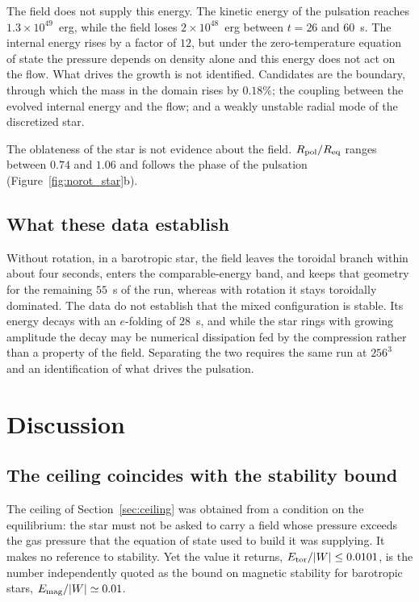 \documentclass[twocolumn,linenumbers]{aastex701}
\newcommand{\Etor}{E_{\rm tor}}
\begin{document}
The field does not supply this energy. The kinetic energy of the pulsation
reaches $1.3\times10^{49}$~erg, while the field loses $2\times10^{48}$~erg
between $t = 26$ and $60$~s. The internal energy rises by a factor of $12$,
but under the zero-temperature equation of state the pressure depends on
density alone and this energy does not act on the flow. What drives the growth
is not identified. Candidates are the boundary, through which the mass in the
domain rises by $0.18\%$; the coupling between the evolved internal energy and
the flow; and a weakly unstable radial mode of the discretized star.

The oblateness of the star is not evidence about the field. $R_{\rm
pol}/R_{\rm eq}$ ranges between $0.74$ and $1.06$ and follows the phase of the
pulsation (Figure~\ref{fig:norot_star}b).

\subsection{What these data establish}

Without rotation, in a barotropic star, the field leaves the toroidal branch
within about four seconds, enters the comparable-energy band, and keeps that
geometry for the remaining $55$~s of the run, whereas with rotation it stays
toroidally dominated. The data do not establish that the mixed configuration
is stable. Its energy decays with an $e$-folding of $28$~s, and while the star
rings with growing amplitude the decay may be numerical dissipation fed by the
compression rather than a property of the field. Separating the two requires
the same run at $256^3$ and an identification of what drives the pulsation.

\section{Discussion} \label{sec:discussion}


\subsection{The ceiling coincides with the stability bound}

The ceiling of Section~\ref{sec:ceiling} was obtained from a condition on the
equilibrium: the star must not be asked to carry a field whose pressure
exceeds the gas pressure that the equation of state used to build it was
supplying. It makes no reference to stability. Yet the value it returns,
$\Etor/|W| \le 0.0101$, is the number independently quoted as the bound on
magnetic stability for barotropic stars, $E_{\rm mag}/|W| \simeq 0.01$.
\end{document}

